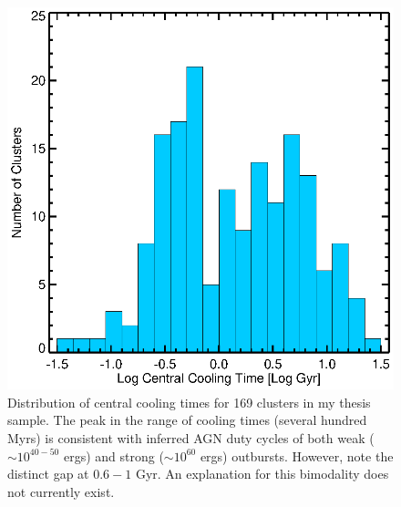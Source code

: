 \documentclass[11pt]{article}
\begin{document}
\begin{figure}[t]
\begin{minipage}[t]{0.6\linewidth}
        \includegraphics*[width=\textwidth, trim=28mm 8mm 30mm 10mm, clip]{tcool}
        \caption{\small Distribution of central cooling times for 169
	clusters in my thesis sample. The peak in the range of cooling
	times (several hundred Myrs) is consistent with inferred AGN
	duty cycles of both weak ($\sim 10^{40-50}$ ergs) and strong ($\sim
	10^{60}$ ergs) outbursts. However, note the distinct gap at $0.6-1$
	Gyr. An explanation for this bimodality does not currently exist.}
	\label{fig:tcool}
    \end{minipage}
\end{figure}
\end{document}
